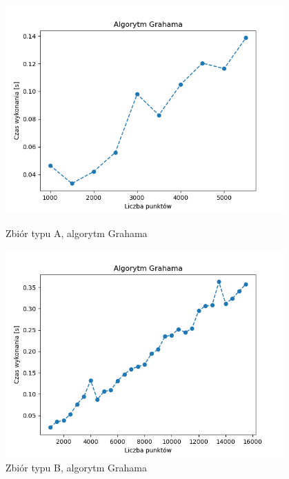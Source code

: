 \documentclass[11pt]{article}
\theoremstyle{remark} \newtheorem{definition}{def.}
\theoremstyle{definition} \newtheorem{twierdzenie}{tw.}
\begin{document}
\begin{figure}[]
    \centering
    \begin{minipage}{0.48\textwidth}
        \centering
        \includegraphics[width=0.95\textwidth]{../tests/chmura-graham.png} %
        \caption{Zbiór typu A, algorytm Grahama}
        \label{fig:chmura-graham}
    \end{minipage}\hfill
    \begin{minipage}{0.48\textwidth}
        \centering
        \includegraphics[width=0.95\textwidth]{../tests/okrag-graham.png} %
        \caption{Zbiór typu B, algorytm Grahama}
        \label{fig:okrag-graham}
    \end{minipage}
\end{figure}
\end{document}
